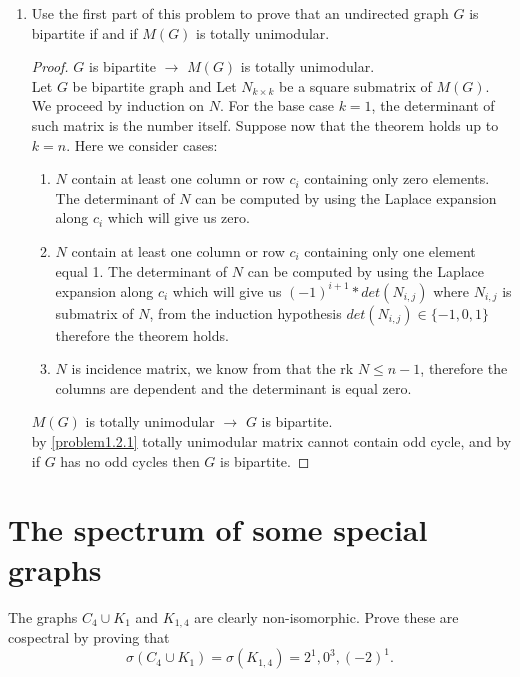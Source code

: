 \documentclass[a4paper, 11pt, oneside]{article}
\newenvironment{problem}[1]
  {\renewcommand\theinnercustomprob{#1}\innercustomprob}
  {\endinnercustomprob}
\begin{document}
\begin{problem}{1.2}
\begin{enumerate}[label=1.2.\arabic*]
\item Use the first part of this problem to prove that an undirected graph $G$ is bipartite if and if $M(G)$ is totally unimodular.
\begin{proof}
$G$ is bipartite $\rightarrow$ $M(G)$ is totally unimodular.\\ 
Let $G$ be bipartite graph and Let $N_{k\times k}$ be a square submatrix of $M(G)$. We proceed by induction on $N$. For the base case $k = 1$, the determinant of such matrix is the number itself. Suppose now that the theorem holds up to $k=n$. Here we consider cases:
\begin{enumerate}[label=(\alph*)]
\item $N$ contain at least one column or row $c_i$ containing only zero elements. The determinant of $N$ can be computed by using the Laplace expansion along $c_i$ which will give us zero.
\item $N$ contain at least one column or row $c_i$ containing only one element equal 1. The determinant of $N$ can be computed by using the Laplace expansion along $c_i$ which will give us $(-1)^{i+ 1} * det(N_{i,j})$ where $N_{i,j}$ is submatrix of $N$, from the induction hypothesis $det(N_{i,j}) \in\{-1, 0, 1\}$ therefore the theorem holds.
\item $N$ is incidence matrix, we know from \cite[Theorem 10]{konig_egervary}  that the rk $N \leq n - 1$, therefore the columns are dependent and the determinant is equal zero.
\end{enumerate}
$M(G)$ is totally unimodular $\rightarrow$ $G$ is bipartite.\\ 
by \ref{problem1.2.1} totally unimodular matrix cannot contain odd cycle, and by \cite{bipartite_odd_cycles} if $G$ has no odd cycles then $G$ is bipartite.
\end{proof}
\end{enumerate}
\end{problem}

\section{The spectrum of some special graphs}

\begin{problem}{2.1}\label{problem2.1}
The graphs $C_4\cup K_1$ and $K_{1,4}$ are clearly non-isomorphic. Prove these are cospectral by proving that 
\begin{equation*}
\sigma(C_4\cup K_1) = \sigma(K_{1,4}) = 2^1, 0^3, (-2)^1.
\end{equation*}
\end{problem}
  
\end{document}
